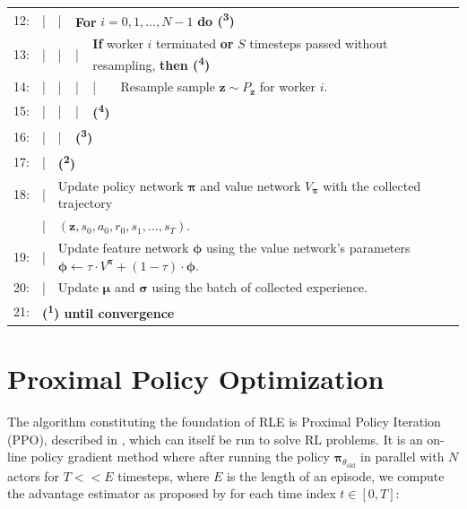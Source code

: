 {\begin{table}[h!]
\begin{tabular}{rlllll}
    12: & | & | & \multicolumn{3}{l}{\textbf{For} $i = 0, 1, ..., N-1$ \textbf{do (\textsuperscript{3})}}\\
    13: & | & | & | & \multicolumn{2}{l}{\textbf{If} worker $i$ terminated \textbf{or} $S$ timesteps passed without resampling, \textbf{then (\textsuperscript{4})}}\\
    14: & | & | & | & | & Resample sample $\textbf{z} \sim P_{\textbf{z}}$ for worker $i$.\\
    15: & | & | & | & \multicolumn{2}{l}{\textbf{(\textsuperscript{4})}}\\
    16: & | & | & \multicolumn{3}{l}{\textbf{(\textsuperscript{3})}}\\
    17: & | & \multicolumn{4}{l}{\textbf{(\textsuperscript{2})}}\\
    18: & | & \multicolumn{4}{l}{Update policy network $\boldsymbol{\pi}$ and value network $V_{\boldsymbol{\pi}}$ with the collected trajectory}\\
    & | & \multicolumn{4}{l}{$(\textbf{z}, s_{0}, a_{0}, r_{0}, s_{1}, ..., s_{T})$.}\\
    19: & | & \multicolumn{4}{l}{Update feature network $\boldsymbol{\phi}$ using the value network's parameters $\boldsymbol{\phi} \leftarrow \tau \cdot V^{\boldsymbol{\pi}} + (1 - \tau) \cdot \boldsymbol{\phi}$.}\\
    20: & | & \multicolumn{4}{l}{Update $\boldsymbol{\mu}$ and $\boldsymbol{\sigma}$ using the batch of collected experience.}\\
    21: & \multicolumn{5}{l}{\textbf{(\textsuperscript{1}) until convergence}}\\
    \hline\hline
  \end{tabular}
\end{table}}

\clearpage
\hypertarget{algo-ppo}{\section{Proximal Policy Optimization}}

\noindent The algorithm constituting the foundation of RLE is Proximal Policy Iteration (PPO), described in \cite{ppo-paper}, which can itself be run to solve RL problems. It is an on-line policy gradient method where after running the policy $\boldsymbol{\pi}_{\theta_{\text{old}}}$ in parallel with $N$ actors for $T << E$ timesteps, where $E$ is the length of an episode, we compute the advantage estimator as proposed by \cite{generalized-advantage-estimation-paper} for each time index $t \in [0, T]$:

